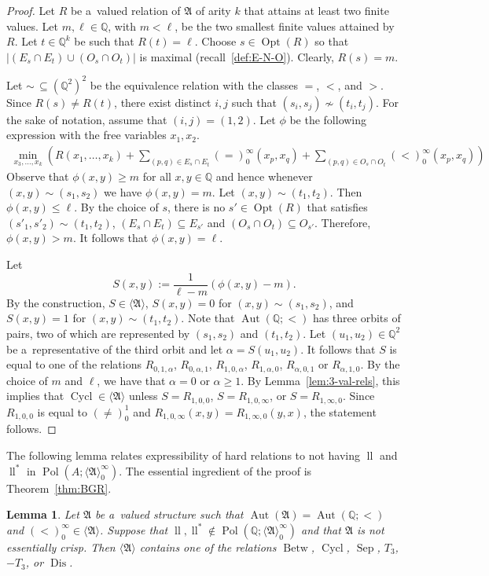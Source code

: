 \documentclass[preprint,12pt]{elsarticle}
\newcommand{\Q}{\mathbb Q}
\newcommand{\bA}{{\mathfrak A}}
\newcommand{\checked}[1]{#1}
\DeclareMathOperator{\Cyc}{Cycl}
\DeclareMathOperator{\Aut}{Aut}
\DeclareMathOperator{\Pol}{Pol}
\DeclareMathOperator{\Opt}{Opt}
\DeclareMathOperator{\lele}{ll}
\DeclareMathOperator{\Betw}{Betw}
\DeclareMathOperator{\Sep}{Sep}
\DeclareMathOperator{\Dis}{Dis}
\newtheorem{lemma}[theorem]{Lemma}
\begin{document}
\begin{proof}
Let $R$ be a~valued relation of $\bA$ of arity $k$ that attains at least two finite values. Let $m,\ell \in {\mathbb Q}$, with $m < \ell$, be the two smallest finite values attained by $R$. Let $t \in \Q^k$ be such that $R(t)=\ell$. 
Choose $s \in \Opt(R)$ so that $|(E_s \cap E_t) \cup (O_s \cap O_t)|$ is maximal (recall~\cref{def:E-N-O}). 
Clearly, $R(s) = m$.

Let $\sim \, \subseteq (\Q^2)^2$ be the equivalence relation with the classes $=$, $<$, and $>$.
Since $R(s) \neq R(t)$, there exist distinct $i,j$ such that $(s_i,s_j) \not \sim (t_i, t_j)$. For the sake of notation, assume that $(i,j)=(1,2)$. Let $\phi$ be the following expression with the free variables $x_1,x_2$.
\begin{align*} \min_{x_3, \dots, x_k} 
\left(
R(x_1, \dots, x_k) + \sum_{(p,q) \in E_s \cap E_t} (=)_0^\infty(x_p,x_q) + \sum_{(p,q) \in O_s \cap O_t} (<)_0^\infty(x_p,x_q) \right)
\end{align*}
Observe that $\phi(x,y) \geq m$ for all $x, y \in \Q$ and hence whenever $(x,y) \sim (s_1, s_2)$ we have $\phi(x,y) = m$. Let $(x,y) \sim (t_1, t_2)$. Then $\phi(x,y) \leq \ell$. By the choice of $s$, there is no $s' \in \Opt(R)$ that satisfies $(s'_1, s'_2) \sim (t_1, t_2)$, $(E_s \cap E_t) \subseteq E_{s'}$ and $(O_s \cap O_t) \subseteq O_{s'}$. Therefore, $\phi(x,y) >m$. It follows that $\phi(x,y) = \ell$. 

Let 
\[S(x,y) := \frac{1}{\ell-m} (\phi(x,y)-m).\]
By the construction, $S \in \langle \bA \rangle$, $S(x,y)=0$ for $(x,y) \sim (s_1,s_2)$, and $S(x,y)=1$ for $(x,y) \sim (t_1, t_2)$. Note that $\Aut(\Q;<)$ has three orbits of pairs, two of which are represented by $(s_1, s_2)$ and $(t_1, t_2)$. Let $(u_1, u_2) \in \Q^2$ be a~representative of the third orbit and let $\alpha =S(u_1, u_2)$. It follows that $S$ is equal to one of the relations $R_{0,1,\alpha}$, $R_{0,\alpha,1}$, $R_{1,0,\alpha}$, $R_{1,\alpha,0}$, $R_{\alpha,0,1}$ or $R_{\alpha,1,0}$. By the choice of $m$ and $\ell$, we have that $\alpha=0$ or $\alpha \geq 1$. By Lemma~\ref{lem:3-val-rels}, this implies that 
$\Cyc \in \langle \bA \rangle$ 
unless $S = R_{1,0,0}$, $S=R_{1,0,\infty}$, or $S=R_{1,\infty,0}$. Since $R_{1,0,0}$ is equal to $(\neq)_0^1$ and $R_{1,0, \infty}(x,y) = R_{1,\infty, 0}(y,x)$, the statement follows.
\end{proof}

\checked{The following lemma relates expressibility of hard relations to not having $\lele$ and $\lele^*$ in $\Pol(A; \langle \bA \rangle_0^\infty)$. The essential ingredient of the proof is Theorem~\ref{thm:BGR}.}
\begin{lemma}\label{lem:lex-viol-crisp}
Let $\bA$ be a~valued structure such that $\Aut(\bA)=\Aut(\Q;<)$ and $(<)_0^\infty \in \langle \bA \rangle$. Suppose that $\checked{\lele, \lele^*} \notin \Pol(\Q; \langle \bA \rangle_0^\infty)$ and that $\bA$ is not  essentially crisp.
Then $\langle \bA \rangle$ contains one of the relations $\Betw$, $\Cyc$, $\Sep$, $T_3$, $-T_3$, or $\Dis$. 
\end{lemma}
\end{document}
